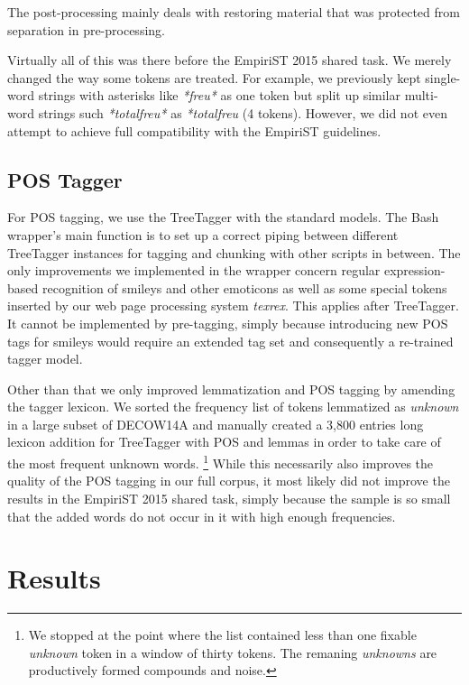 \documentclass[11pt]{article}
\begin{document}
The post-processing mainly deals with restoring material that was protected from separation in pre-processing.

Virtually all of this was there before the EmpiriST 2015 shared task.
We merely changed the way some tokens are treated.
For example, we previously kept single-word strings with asterisks like \textit{*freu*} as one token but split up similar multi-word strings such \textit{*total\textvisiblespace freu*} as \textit{*\textvisiblespace total\textvisiblespace freu\textvisiblespace *} (4 tokens).
However, we did not even attempt to achieve full compatibility with the EmpiriST guidelines.

\subsection{POS Tagger}
\label{sec:postagger}

For POS tagging, we use the TreeTagger \cite{Schmid1994b,Schmid1995} with the standard models.
The Bash wrapper's main function is to set up a correct piping between different TreeTagger instances for tagging and chunking with other scripts in between.
The only improvements we implemented in the wrapper concern regular expression-based recognition of smileys and other emoticons as well as some special tokens inserted by our web page processing system \textit{texrex}.
This applies after TreeTagger.
It cannot be implemented by pre-tagging, simply because introducing new POS tags for smileys would require an extended tag set and consequently a re-trained tagger model.

Other than that we only improved lemmatization and POS tagging by amending the tagger lexicon.
We sorted the frequency list of tokens lemmatized as \textit{unknown} in a large subset of DECOW14A and manually created a 3,800 entries long lexicon addition for TreeTagger with POS and lemmas in order to take care of the most frequent unknown words.%
\footnote{We stopped at the point where the list contained less than one fixable \textit{unknown} token in a window of thirty tokens.
The remaning \textit{unknowns} are productively formed compounds and noise.}
While this necessarily also improves the quality of the POS tagging in our full corpus, it most likely did not improve the results in the EmpiriST 2015 shared task, simply because the sample is so small that the added words do not occur in it with high enough frequencies.

\section{Results}
\label{sec:results}
\end{document}
